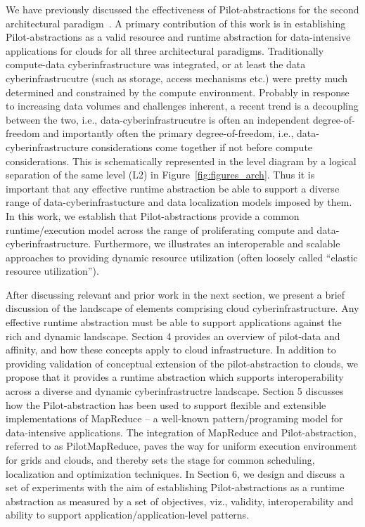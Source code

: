 \documentclass[times]{cpeauth}
\newcommand{\pilot}{Pilot\xspace}
\newcommand{\pilotmapreduce}{PilotMapReduce\xspace}
\begin{document}
We have previously discussed the effectiveness of Pilot-abstractions
for the second architectural paradigm~\cite{}.  A primary contribution
of this work is in establishing \pilot-abstractions as a valid
resource and runtime abstraction for data-intensive applications for
clouds for all three architectural paradigms.  Traditionally
compute-data cyberinfrastructure was integrated, or at least the data
cyberinfrastrucutre (such as storage, access mechanisms etc.)  were
pretty much determined and constrained by the compute environment.
Probably in response to increasing data volumes and challenges
inherent, a recent trend is a decoupling between the two, i.e.,
data-cyberinfrastrucutre is often an independent degree-of-freedom and
importantly often the primary degree-of-freedom, i.e.,
data-cyberinfrastructure considerations come together if not before
compute considerations.  This is schematically represented in the
level diagram by a logical separation of the same level (L2) in
Figure~\ref{fig:figures_arch}.  Thus it is important that any
effective runtime abstraction be able to support a diverse range of
data-cyberinfrastucture and data localization models imposed by them.
In this work, we establish that \pilot-abstractions provide a common
runtime/execution model across the range of proliferating compute and
data-cyberinfrastructure.  Furthermore, we illustrates an
interoperable and scalable approaches to providing dynamic resource
utilization (often loosely called ``elastic resource utilization'').

After discussing relevant and prior work in the next section, we
present a brief discussion of the landscape of elements comprising
cloud cyberinfrastructure. Any effective runtime abstraction must be
able to support applications against the rich and dynamic landscape.
Section 4 provides an overview of pilot-data and affinity, and how
these concepts apply to cloud infrastructure. In addition to providing
validation of conceptual extension of the pilot-abstraction to clouds,
we propose that it provides a runtime abstraction which supports
interoperability across a diverse and dynamic cyberinfrastructre
landscape.  Section 5 discusses how the \pilot-abstraction has been
used to support flexible and extensible implementations of MapReduce
-- a well-known pattern/programing model for data-intensive
applications.  The integration of MapReduce and \pilot-abstraction,
referred to as \pilotmapreduce, paves the way for uniform execution
environment for grids and clouds, and thereby sets the stage for
common scheduling, localization and optimization techniques.  In
Section 6, we design and discuss a set of experiments with the aim of
establishing \pilot-abstractions as a runtime abstraction as measured
by a set of objectives, viz., validity, interoperability and ability
to support application/application-level patterns.
\end{document}
